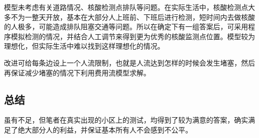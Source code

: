\documentclass{cumcmthesis}
\begin{document}
模型未考虑有关道路情况、核酸检测点排队等问题。在实际生活中，核酸检测点大多不为一整天开放，基本在大部分人上班前、下班后进行检测，短时间内去做核酸的人极多，可能造成排队阻塞交通等问题。所以在确定下有一组答案后，可采用程序模拟检测的情况，并结合人工调节来得到更为优秀的核酸监测点位置。模型较为理想化，但实际生活中难以找到这样理想化的情况。

改进可给每条边设上一个人流限制，也就是人流达到怎样的时候会发生堵塞，然后再保证减少堵塞的情况下利用费用流模型求解。

\subsection{总结}

虽有不足，但笔者在真实出现的小区上的测试，均得到了较为满意的答案，确实满足了绝大部分人的利益，并保证基本所有人不会感到不公平。

\newpage


\newpage
\end{document}
